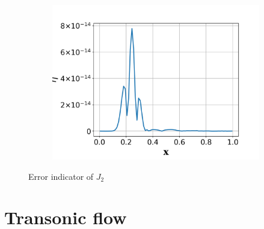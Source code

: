\documentclass[a4paper]{article}
\begin{document}
\begin{figure}[!htbp]
\begin{subfigure}{0.325\textwidth}
    \centering
    \includegraphics[width=1.0\linewidth]{figures/elem_J2error_indicator_p3.png}
    \label{fig:subsonic_J2_eta_p3}
  \end{subfigure}
  \caption{Error indicator of $J_2$}
  \label{fig:elem_J2_error}
\end{figure}

\section{Transonic flow}
\end{document}
